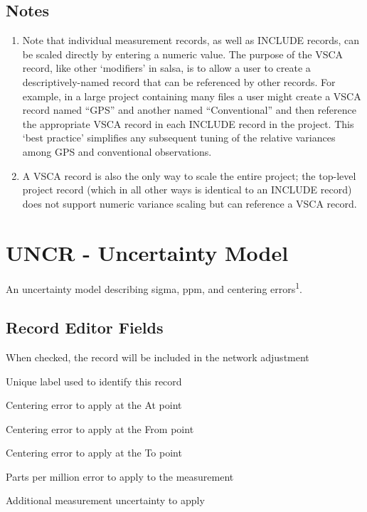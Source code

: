 \subsection*{Notes}
\begin{enumerate}
\item Note that individual measurement records, as well as INCLUDE records, can be scaled directly by entering a numeric value.  The purpose of the VSCA record, like other `modifiers' in \textsf{salsa}, is to allow a user to create a descriptively-named record that can be referenced by other records.  For example, in a large project containing many files a user might create a VSCA record named ``GPS'' and another named ``Conventional'' and then reference the appropriate VSCA record in each INCLUDE record in the project.  This `best practice' simplifies any subsequent tuning of the relative variances among GPS and conventional observations.
\item A VSCA record is also the only way to scale the entire project; the top-level project record (which in all other ways is identical to an INCLUDE record) does not support numeric variance scaling but can reference a VSCA record.
\end{enumerate}


\newpage
\section{UNCR - Uncertainty Model}

An uncertainty model describing sigma, ppm, and centering errors\textsuperscript{1}.

\subsection*{Record Editor Fields}

\begin{description}[leftmargin=!,labelwidth=\widthof{\bfseries From Cent Err:}]
\item[Enabled:] When checked, the record will be included in the network adjustment
\item[Label:] Unique label used to identify this record
\item[At Cent Err:] Centering error to apply at the At point
\item[From Cent Err:] Centering error to apply at the From point
\item[To Cent Err:] Centering error to apply at the To point
\item[PPM:] Parts per million error to apply to the measurement
\item[Sigma:] Additional measurement uncertainty to apply
\end{description}

